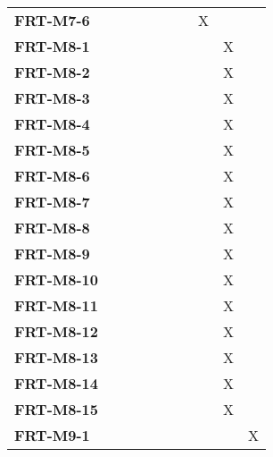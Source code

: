 \documentclass[12pt, titlepage]{article}
\begin{document}
\begin{longtable}{|l|ccccccc|}
	\textbf{FRT-M7-6}  & ~                                        & ~           & ~           & ~           & X           & ~           & ~           \\
	\textbf{FRT-M8-1}  & ~                                        & ~           & ~           & ~           & ~           & X           & ~           \\
	\textbf{FRT-M8-2}  & ~                                        & ~           & ~           & ~           & ~           & X           & ~           \\
	\textbf{FRT-M8-3}  & ~                                        & ~           & ~           & ~           & ~           & X           & ~           \\
	\textbf{FRT-M8-4}  & ~                                        & ~           & ~           & ~           & ~           & X           & ~           \\
	\textbf{FRT-M8-5}  & ~                                        & ~           & ~           & ~           & ~           & X           & ~           \\
	\textbf{FRT-M8-6}  & ~                                        & ~           & ~           & ~           & ~           & X           & ~           \\
	\textbf{FRT-M8-7}  & ~                                        & ~           & ~           & ~           & ~           & X           & ~           \\
	\textbf{FRT-M8-8}  & ~                                        & ~           & ~           & ~           & ~           & X           & ~           \\
	\textbf{FRT-M8-9}  & ~                                        & ~           & ~           & ~           & ~           & X           & ~           \\
	\textbf{FRT-M8-10} & ~                                        & ~           & ~           & ~           & ~           & X           & ~           \\
	\textbf{FRT-M8-11} & ~                                        & ~           & ~           & ~           & ~           & X           & ~           \\
	\textbf{FRT-M8-12} & ~                                        & ~           & ~           & ~           & ~           & X           & ~           \\
	\textbf{FRT-M8-13} & ~                                        & ~           & ~           & ~           & ~           & X           & ~           \\
	\textbf{FRT-M8-14} & ~                                        & ~           & ~           & ~           & ~           & X           & ~           \\
	\textbf{FRT-M8-15} & ~                                        & ~           & ~           & ~           & ~           & X           & ~           \\
	\textbf{FRT-M9-1}  & ~                                        & ~           & ~           & ~           & ~           & ~           & X           \\
	\hline
\end{longtable}
\end{document}
